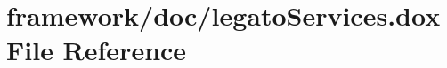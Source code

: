 \hypertarget{legato_services_8dox}{}\section{framework/doc/legato\+Services.dox File Reference}
\label{legato_services_8dox}
